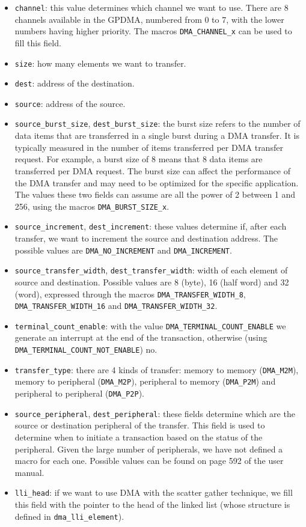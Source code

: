 \begin{itemize}
    \item \texttt{channel}: this value determines which channel we want to use. There are 8 channels available in the GPDMA, numbered from 0 to 7, with the lower numbers having higher priority. The macros \texttt{DMA\_CHANNEL\_x} can be used to fill this field.
    \item \texttt{size}: how many elements we want to transfer.
    \item \texttt{dest}: address of the destination.
    \item \texttt{source}: address of the source.
    \item \texttt{source\_burst\_size}, \texttt{dest\_burst\_size}: the burst size refers to the number of data items that are transferred in a single burst during a DMA transfer. It is typically measured in the number of items transferred per DMA transfer request. For example, a burst size of 8 means that 8 data items are transferred per DMA request. The burst size can affect the performance of the DMA transfer and may need to be optimized for the specific application. The values these two fields can assume are all the power of 2 between 1 and 256, using the macros \texttt{DMA\_BURST\_SIZE\_x}. 
    \item \texttt{source\_increment}, \texttt{dest\_increment}: these values determine if, after each transfer, we want to increment the source and destination address. The possible values are \texttt{DMA\_NO\_INCREMENT} and \texttt{DMA\_INCREMENT}. 
    \item \texttt{source\_transfer\_width}, \texttt{dest\_transfer\_width}: width of each element of source and destination. Possible values are 8 (byte), 16 (half word) and 32 (word), expressed through the macros \texttt{DMA\_TRANSFER\_WIDTH\_8}, \texttt{DMA\_TRANSFER\_WIDTH\_16} and \texttt{DMA\_TRANSFER\_WIDTH\_32}.
    \item \texttt{terminal\_count\_enable}: with the value \texttt{DMA\_TERMINAL\_COUNT\_ENABLE} we generate an interrupt at the end of the transaction, otherwise (using \texttt{DMA\_TERMINAL\_COUNT\_NOT\_ENABLE}) no.
    \item \texttt{transfer\_type}: there are 4 kinds of transfer: memory to memory (\texttt{DMA\_M2M}), memory to peripheral (\texttt{DMA\_M2P}), peripheral to memory (\texttt{DMA\_P2M}) and peripheral to peripheral (\texttt{DMA\_P2P}). 
    \item \texttt{source\_peripheral}, \texttt{dest\_peripheral}: these fields determine which are the source or destination peripheral of the transfer. This field is used to determine when to initiate a transaction based on the status of the peripheral. Given the large number of peripherals, we have not defined a macro for each one. Possible values can be found on page 592 of the user manual.
    \item \texttt{lli\_head}: if we want to use DMA with the scatter gather technique, we fill this field with the pointer to the head of the linked list (whose structure is defined in \texttt{dma\_lli\_element}). 
\end{itemize}

